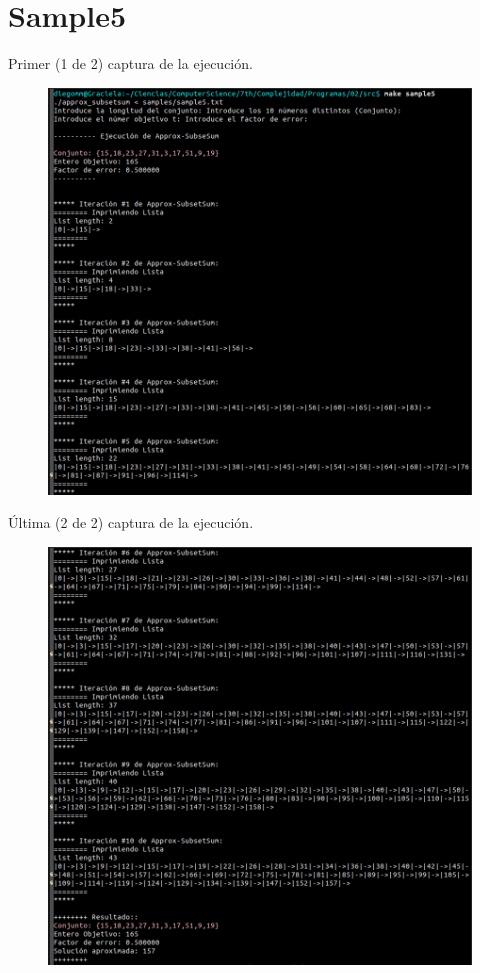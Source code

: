 \documentclass[14pt,letterpaper]{article}
\begin{document}
\section {\sc Sample5}  
  Primer (1 de 2) captura de la ejecución.
  \begin{figure}[h]
    \includegraphics[width=15cm]{sample5_1.png}
    \centering
  \end{figure}
  \clearpage
  Última (2 de 2) captura de la ejecución.
  \begin{figure}[h]
    \includegraphics[width=15cm]{sample5_2.png}
    \centering
  \end{figure}
  \clearpage
\end{document}
